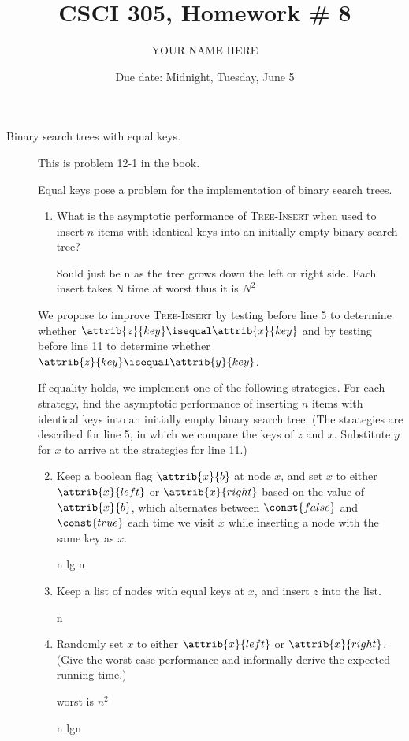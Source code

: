 \documentclass{article}
\title{CSCI 305, Homework \# 8}
\author{YOUR NAME HERE}
\date{Due date:  Midnight, Tuesday, June 5}
\begin{document}
\maketitle

\begin{description}
\item[Binary search trees with equal keys.]  This is problem 12-1
  in the book.

  Equal keys pose a problem for the implementation of binary
  search trees.
  \begin{enumerate}
  \item What is the asymptotic performance of \textsc{Tree-Insert} when
    used to insert $n$ items with identical keys into an initially empty
    binary search tree?

    Sould just be n as the tree grows down the left or right side. Each insert takes N time at worst thus it is $N^2$

  \end{enumerate}
  We propose to improve \textsc{Tree-Insert} by testing before line 5
  to determine whether $\attrib{z}{key} \isequal\attrib{x}{key}$ 
  and by testing before line 11 to determine whether
  $\attrib{z}{key} \isequal\attrib{y}{key}$.

  If equality holds, we
  implement one of the following strategies.  For each strategy, find
  the asymptotic performance of inserting $n$ items with identical
  keys into an initially empty binary search tree.  (The strategies
  are described for line 5, in which we compare the keys of $z$ and
  $x$.  Substitute $y$ for $x$ to arrive at the strategies for line
  11.) 
  \begin{enumerate}\setcounter{enumi}{1}
  \item Keep a boolean flag $\attrib{x}{b}$ at node $x$, and set $x$
    to either $\attrib{x}{left}$ or $\attrib{x}{right}$ based on the
    value of $\attrib{x}{b}$, which alternates between $\const{false}$
    and $\const{true}$ each time we visit $x$ while inserting a node
    with the same key as $x$. 

    n lg n
\item Keep a list of nodes with equal keys at $x$, and insert $z$ into
  the list.

  n

  \item Randomly set $x$ to either $\attrib{x}{left}$ or
    $\attrib{x}{right}$.  (Give the worst-case performance and
    informally derive the expected running time.)

    worst is $n^2$

    n lgn
  \end{enumerate}
  

\end{description}
\end{document}
